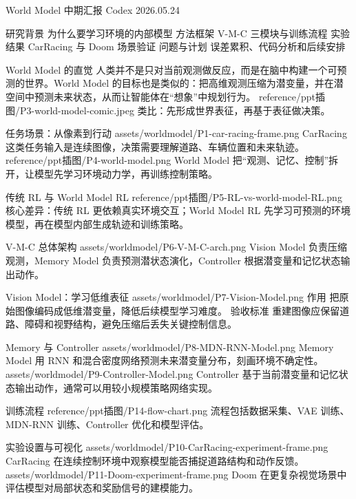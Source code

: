 \documentclass[aspectratio=169]{beamer}
\newcommand{\wmasset}[1]{reference/ppt插图/#1}
\newcommand{\wmgen}[1]{assets/worldmodel/#1}
\begin{document}
\WinterCover
  {World Model}
  {中期汇报}
  {Codex}
  {2026.05.24}

\WinterTOC
  {研究背景}
  {为什么要学习环境的内部模型}
  {方法框架}
  {V-M-C 三模块与训练流程}
  {实验结果}
  {CarRacing 与 Doom 场景验证}
  {问题与计划}
  {误差累积、代码分析和后续安排}


\WinterTextImageFrame
  {World Model 的直觉}
  {人类并不是只对当前观测做反应，而是在脑中构建一个可预测的世界。World Model 的目标也是类似的：把高维观测压缩为潜变量，并在潜空间中预测未来状态，从而让智能体在“想象”中规划行为。}
  {\wmasset{P3-world-model-comic.jpeg}}
  {类比：先形成世界表征，再基于表征做决策。}

\WinterTwoImageCompareFrame
  {任务场景：从像素到行动}
  {\wmgen{P1-car-racing-frame.png}}
  {CarRacing 这类任务输入是连续图像，决策需要理解道路、车辆位置和未来轨迹。}
  {\wmasset{P4-world-model.png}}
  {World Model 把“观测、记忆、控制”拆开，让模型先学习环境动力学，再训练控制策略。}

\WinterWideImageFrame
  {传统 RL 与 World Model RL}
  {\wmasset{P5-RL-vs-world-model-RL.png}}
  {核心差异：传统 RL 更依赖真实环境交互；World Model RL 先学习可预测的环境模型，再在模型内部生成轨迹和训练策略。}


\WinterArchitectureFrame
  {V-M-C 总体架构}
  {\wmgen{P6-V-M-C-arch.png}}
  {Vision Model 负责压缩观测，Memory Model 负责预测潜状态演化，Controller 根据潜变量和记忆状态输出动作。}

\WinterArchitecturePointsFrame
  {Vision Model：学习低维表征}
  {\wmgen{P7-Vision-Model.png}}
  {作用}
  {把原始图像编码成低维潜变量，降低后续模型学习难度。}
  {验收标准}
  {重建图像应保留道路、障碍和视野结构，避免压缩后丢失关键控制信息。}

\WinterDualArchitectureFrame
  {Memory 与 Controller}
  {\wmgen{P8-MDN-RNN-Model.png}}
  {Memory Model}
  {用 RNN 和混合密度网络预测未来潜变量分布，刻画环境不确定性。}
  {\wmgen{P9-Controller-Model.png}}
  {Controller}
  {基于当前潜变量和记忆状态输出动作，通常可以用较小规模策略网络实现。}

\WinterArchitectureFrame
  {训练流程}
  {\wmasset{P14-flow-chart.png}}
  {流程包括数据采集、VAE 训练、MDN-RNN 训练、Controller 优化和模型评估。}


\WinterExperimentCompareFrame
  {实验设置与可视化}
  {\wmgen{P10-CarRacing-experiment-frame.png}}
  {CarRacing}
  {在连续控制环境中观察模型能否捕捉道路结构和动作反馈。}
  {\wmgen{P11-Doom-experiment-frame.png}}
  {Doom}
  {在更复杂视觉场景中评估模型对局部状态和奖励信号的建模能力。}
\end{document}
